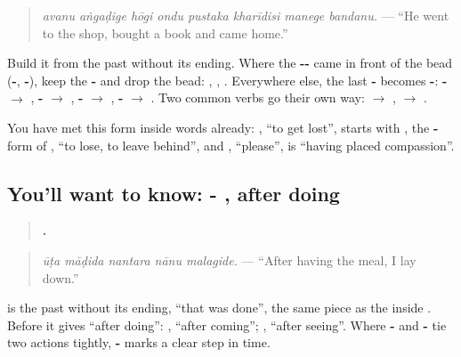 \begin{quote}
\emph{avanu aṅgaḍige hōgi ondu pustaka kharīdisi manege bandanu.} — \textquotedblleft{}He went to the shop, bought a book and came home.\textquotedblright{}
\end{quote}

Build it from the past without its ending. Where the \textbf{--} came in front of the bead (\textbf{-}, \textbf{-}), keep the \textbf{-} and drop the bead: \textbf{}, \textbf{}, \textbf{}. Everywhere else, the last \textbf{-} becomes \textbf{-}: \textbf{-} $\to$ \textbf{}, \textbf{-} $\to$ \textbf{}, \textbf{-} $\to$ \textbf{}, \textbf{-} $\to$ \textbf{}. Two common verbs go their own way: \textbf{} $\to$ \textbf{}, \textbf{} $\to$ \textbf{}.

You have met this form inside words already: \textbf{}, \textquotedblleft{}to get lost\textquotedblright{}, starts with \textbf{}, the \textbf{-} form of \textbf{}, \textquotedblleft{}to lose, to leave behind\textquotedblright{}, and \textbf{}, \textquotedblleft{}please\textquotedblright{}, is \textquotedblleft{}having placed compassion\textquotedblright{}.

\subsection*{You'll want to know: - , after doing}
\begin{quote}
\textbf{    .}
\end{quote}

\begin{quote}
\emph{ūṭa māḍida nantara nānu malagide.} — \textquotedblleft{}After having the meal, I lay down.\textquotedblright{}
\end{quote}

\textbf{} is the past without its ending, \textquotedblleft{}that was done\textquotedblright{}, the same piece as the \textbf{} inside \textbf{}. Before \textbf{} it gives \textquotedblleft{}after doing\textquotedblright{}: \textbf{ }, \textquotedblleft{}after coming\textquotedblright{}; \textbf{ }, \textquotedblleft{}after seeing\textquotedblright{}. Where \textbf{-} and \textbf{-} tie two actions tightly, \textbf{- } marks a clear step in time.

